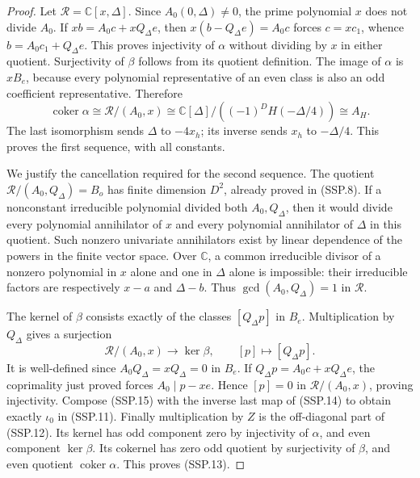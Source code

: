 \begin{proof}
Let \(\mathcal R=\mathbb C[x,\Delta]\).
Since \(A_0(0,\Delta)\ne0\), the prime polynomial \(x\)
does not divide \(A_0\).  If \(xb=A_0c+xQ_\Delta e\),
then \(x(b-Q_\Delta e)=A_0c\) forces \(c=xc_1\), whence
\(b=A_0c_1+Q_\Delta e\).
This proves injectivity of \(\alpha\) without dividing by
\(x\) in either quotient.  Surjectivity of \(\beta\) follows
from its quotient definition.
The image of \(\alpha\) is \(xB_e\), because every polynomial
representative of an even class is also an odd coefficient
representative.  Therefore
\[
 \operatorname{coker}\alpha
 \cong\mathcal R/(A_0,x)
 \cong\mathbb C[\Delta]/((-1)^DH(-\Delta/4))
 \cong A_H .
 \tag{SSP.14}
\]
The last isomorphism sends \(\Delta\) to \(-4x_h\);
its inverse sends \(x_h\) to \(-\Delta/4\).
This proves the first sequence, with all constants.

We justify the cancellation required for the second sequence.
The quotient \(\mathcal R/(A_0,Q_\Delta)=B_o\) has finite
dimension \(D^2\), already proved in (SSP.8).
If a nonconstant irreducible polynomial divided both
\(A_0,Q_\Delta\), then it would divide every polynomial
annihilator of \(x\) and every polynomial annihilator of
\(\Delta\) in this quotient.  Such nonzero univariate
annihilators exist by linear dependence of the powers in
the finite vector space.  Over \(\mathbb C\), a common
irreducible divisor of a nonzero polynomial in \(x\) alone
and one in \(\Delta\) alone is impossible: their irreducible
factors are respectively \(x-a\) and \(\Delta-b\).
Thus \(\gcd(A_0,Q_\Delta)=1\) in \(\mathcal R\).

The kernel of \(\beta\) consists exactly of the classes
\([Q_\Delta p]\) in \(B_e\).
Multiplication by \(Q_\Delta\) gives a surjection
\[
 \mathcal R/(A_0,x)\longrightarrow\ker\beta,\qquad
 [p]\longmapsto[Q_\Delta p].
 \tag{SSP.15}
\]
It is well-defined since \(A_0Q_\Delta=xQ_\Delta=0\)
in \(B_e\).  If \(Q_\Delta p=A_0c+xQ_\Delta e\), the
coprimality just proved forces \(A_0\mid p-xe\).
Hence \([p]=0\) in \(\mathcal R/(A_0,x)\), proving
injectivity.  Compose (SSP.15) with the inverse last map of
(SSP.14) to obtain exactly \(\iota_0\) in (SSP.11).
Finally multiplication by \(Z\) is the off-diagonal part
of (SSP.12).  Its kernel has odd component zero by
injectivity of \(\alpha\), and even component \(\ker\beta\).
Its cokernel has zero odd quotient by surjectivity of
\(\beta\), and even quotient \(\operatorname{coker}\alpha\).
This proves (SSP.13).
\end{proof}


